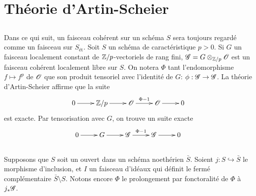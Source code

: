 \section{Th\'eorie d'Artin-Scheier}\label{III:3}





\subsection{}\label{III:3-1}

Dans ce qui suit, un faisceau coh\'erent sur un sch\'ema $S$ sera toujours 
regard\'e comme un faisceau sur $S_\text{\'et}$. Soit $S$ un sch\'ema de 
caract\'eristique $p>0$. Si $G$ un faisceau localement constant de 
$\mathbb{Z}/p$-vectoriels de rang fini, $\mathscr{G}=G\otimes_{\mathbb{Z}/p}\mathscr{O}$ est un faisceau 
coh\'erent localement libre sur $S$. On notera $\Phi$ tant l'endomorphisme 
$f\mapsto f^p$ de $\mathscr{O}$ que son produit tensoriel avec l'identit\'e de 
$G$: $\phi:\mathscr{G}\to\mathscr{G}$. La th\'eorie d'Artin-Scheier \cite[IX 3.5]{sga4} 
affirme que la suite 
\[\xymatrix{
  0 \ar[r] 
    & \dZ/p \ar[r] 
    & \cO \ar[r]^-{\Phi-1} 
    & \cO \ar[r] 
    & 0
}\]
est exacte. Par tensorisation avec $G$, on trouve un suite exacte 
\[\xymatrix{
  0 \ar[r] 
    & G \ar[r] 
    & \cG \ar[r]^-{\Phi-1} 
    & \cG \ar[r] 
    & 0
}\]





\subsection{}\label{III:3-2}

Supposons que $S$ soit un ouvert dans un sch\'ema noeth\'erien $\bar S$. 
Soient $j:S\hookrightarrow \bar S$ le morphisme d'inclusion, et $I$ un 
faisceau d'id\'eaux qui d\'efinit le ferm\'e compl\'ementaire 
$\bar S\setminus S$. Notons encore $\Phi$ le prolongement par fonctoralit\'e 
de $\Phi$ \`a $j_*\mathscr{G}$. 






